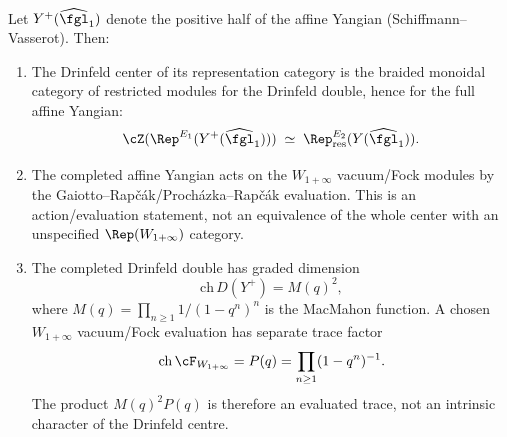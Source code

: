 \begin{theorem}
\label{thm:drinfeld-center-coha}
Let $Y^+(\widehat{\fgl}_1)$ denote the positive half of the affine Yangian (Schiffmann--Vasserot). Then:
\begin{enumerate}[label=(\roman*)]
 \item The Drinfeld center of its representation category is the braided monoidal category of restricted modules for the Drinfeld double, hence for the full affine Yangian:
 \[
 \cZ(\Rep^{E_1}(Y^+(\widehat{\fgl}_1))) \;\simeq\; \Rep^{E_2}_{\mathrm{res}}(Y(\widehat{\fgl}_1)).
 \]
 \item The completed affine Yangian acts on the $W_{1+\infty}$ vacuum/Fock modules by the Gaiotto--Rap\v{c}\'ak/Proch\'azka--Rap\v{c}\'ak evaluation. This is an action/evaluation statement, not an equivalence of the whole center with an unspecified $\Rep(W_{1+\infty})$ category.
 \item The completed Drinfeld double has graded dimension
 \[
 \mathrm{ch}\,D(Y^+) = M(q)^2,
 \]
where $M(q) = \prod_{n \geq 1} 1/(1-q^n)^n$ is the MacMahon
function.  A chosen $W_{1+\infty}$ vacuum/Fock evaluation has
separate trace factor
\[
 \mathrm{ch}\,\cF_{W_{1+\infty}}=P(q)=\prod_{n \geq 1}(1-q^n)^{-1}.
\]
The product \(M(q)^2P(q)\) is therefore an evaluated trace, not an
intrinsic character of the Drinfeld centre.
\end{enumerate}
\end{theorem}

